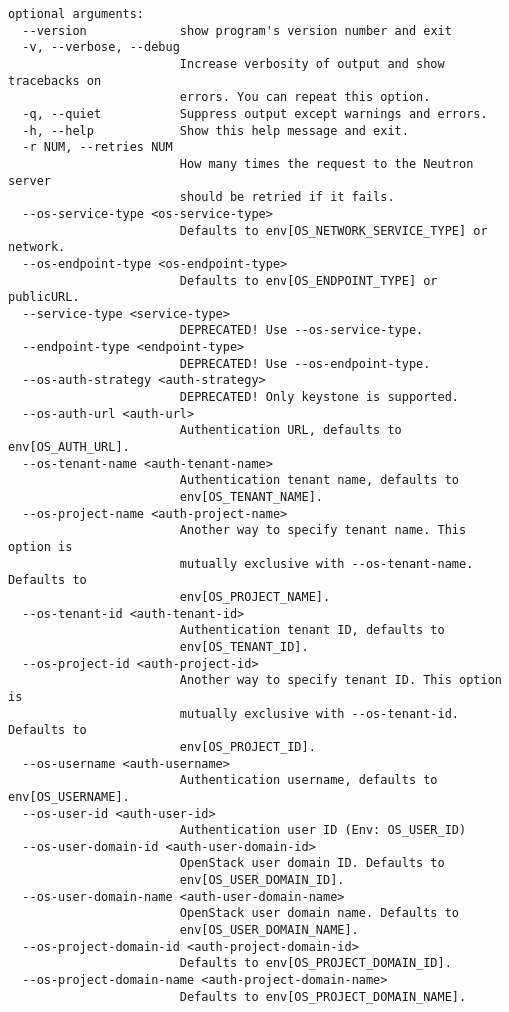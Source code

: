 \documentclass[a4paper,left=1.5cm,right=1.5cm,11pt]{article}
\begin{document}
\begin{lstlisting}
optional arguments:
  --version             show program's version number and exit
  -v, --verbose, --debug
                        Increase verbosity of output and show tracebacks on
                        errors. You can repeat this option.
  -q, --quiet           Suppress output except warnings and errors.
  -h, --help            Show this help message and exit.
  -r NUM, --retries NUM
                        How many times the request to the Neutron server
                        should be retried if it fails.
  --os-service-type <os-service-type>
                        Defaults to env[OS_NETWORK_SERVICE_TYPE] or network.
  --os-endpoint-type <os-endpoint-type>
                        Defaults to env[OS_ENDPOINT_TYPE] or publicURL.
  --service-type <service-type>
                        DEPRECATED! Use --os-service-type.
  --endpoint-type <endpoint-type>
                        DEPRECATED! Use --os-endpoint-type.
  --os-auth-strategy <auth-strategy>
                        DEPRECATED! Only keystone is supported.
  --os-auth-url <auth-url>
                        Authentication URL, defaults to env[OS_AUTH_URL].
  --os-tenant-name <auth-tenant-name>
                        Authentication tenant name, defaults to
                        env[OS_TENANT_NAME].
  --os-project-name <auth-project-name>
                        Another way to specify tenant name. This option is
                        mutually exclusive with --os-tenant-name. Defaults to
                        env[OS_PROJECT_NAME].
  --os-tenant-id <auth-tenant-id>
                        Authentication tenant ID, defaults to
                        env[OS_TENANT_ID].
  --os-project-id <auth-project-id>
                        Another way to specify tenant ID. This option is
                        mutually exclusive with --os-tenant-id. Defaults to
                        env[OS_PROJECT_ID].
  --os-username <auth-username>
                        Authentication username, defaults to env[OS_USERNAME].
  --os-user-id <auth-user-id>
                        Authentication user ID (Env: OS_USER_ID)
  --os-user-domain-id <auth-user-domain-id>
                        OpenStack user domain ID. Defaults to
                        env[OS_USER_DOMAIN_ID].
  --os-user-domain-name <auth-user-domain-name>
                        OpenStack user domain name. Defaults to
                        env[OS_USER_DOMAIN_NAME].
  --os-project-domain-id <auth-project-domain-id>
                        Defaults to env[OS_PROJECT_DOMAIN_ID].
  --os-project-domain-name <auth-project-domain-name>
                        Defaults to env[OS_PROJECT_DOMAIN_NAME].

\end{lstlisting}
\end{document}
